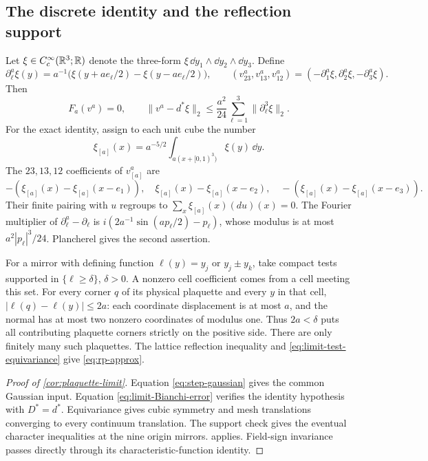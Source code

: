 \subsection{The discrete identity and the reflection support}
Let \(\xi\in C_c^\infty(\mathbb R^3;\mathbb R)\) denote the three-form
\(\xi\,\dd y_1\wedge\dd y_2\wedge\dd y_3\). Define
\[
 \partial_\ell^a\xi(y)
 =a^{-1}\bigl(\xi(y+ae_\ell/2)-\xi(y-ae_\ell/2)\bigr),\qquad
 (v^a_{23},v^a_{13},v^a_{12})
 =(-\partial_1^a\xi,\partial_2^a\xi,-\partial_3^a\xi).
\]
Then
\begin{equation}\label{eq:limit-Bianchi-error}
 F_a(v^a)=0,\qquad
 \|v^a-d^*\xi\|_2
 \le\frac{a^2}{24}\sum_{\ell=1}^3\|\partial_\ell^3\xi\|_2.
\end{equation}
For the exact identity, assign to each unit cube the number
\[
 \xi_{[a]}(x)=a^{-5/2}\int_{a(x+[0,1)^3)}\xi(y)\,\dd y.
\]
The \(23,13,12\) coefficients of \(v^a_{[a]}\) are
\[
 -(\xi_{[a]}(x)-\xi_{[a]}(x-e_1)),\quad
 \xi_{[a]}(x)-\xi_{[a]}(x-e_2),\quad
 -(\xi_{[a]}(x)-\xi_{[a]}(x-e_3)).
\]
Their finite pairing with \(u\) regroups to
\(\sum_x\xi_{[a]}(x)(du)(x)=0\).
The Fourier multiplier of
\(\partial_\ell^a-\partial_\ell\) is
\(i(2a^{-1}\sin(ap_\ell/2)-p_\ell)\), whose modulus is at most
\(a^2|p_\ell|^3/24\). Plancherel gives the second assertion.

For a mirror with defining function
\(\ell(y)=y_j\) or \(y_j\pm y_k\), take compact tests supported
in \(\{\ell\ge\delta\}\), \(\delta>0\).
A nonzero cell coefficient comes from a cell meeting this set.
For every corner \(q\) of its physical plaquette and every \(y\)
in that cell, \(|\ell(q)-\ell(y)|\le2a\):
each coordinate displacement is at most \(a\), and the normal
has at most two nonzero coordinates of modulus one.
Thus \(2a<\delta\) puts all contributing plaquette corners
strictly on the positive side. There are only finitely many such
plaquettes. The lattice reflection inequality and
\eqref{eq:limit-test-equivariance} give \eqref{eq:rp-approx}.

\begin{proof}[Proof of \cref{cor:plaquette-limit}]
Equation \eqref{eq:step-gaussian} gives the common Gaussian input.
Equation \eqref{eq:limit-Bianchi-error} verifies the identity
hypothesis with \(D^*=d^*\). Equivariance gives cubic symmetry and
mesh translations converging to every continuum translation.
The support check gives the eventual character inequalities at the
nine origin mirrors.  applies.
Field-sign invariance passes directly through its
characteristic-function identity.
\end{proof}


